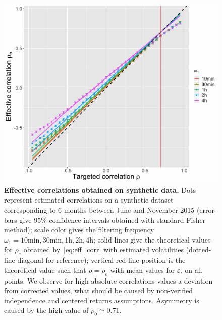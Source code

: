 \documentclass{article}
\begin{document}
\begin{figure}%
\centering
\includegraphics[width=\linewidth]{Fig4.jpg}
\caption{\textbf{Effective correlations obtained on synthetic data.} Dots represent estimated correlations on a synthetic dataset corresponding to 6 months between June and November 2015 (error-bars give 95\% confidence intervals obtained with standard Fisher method); scale color gives the filtering frequency $\omega_1=10\textrm{min},30\textrm{min},1\textrm{h},2\textrm{h},4\textrm{h}$; solid lines give the theoretical values for $\rho_e$ obtained by~\ref{eq:eff_corr} with estimated volatilities (dotted-line diagonal for reference); vertical red line position is the theoretical value such that $\rho = \rho_e$ with mean values for $\varepsilon_i$ on all points. We observe for high absolute correlations values a deviation from corrected values, what should be caused by non-verified independence and centered returns assumptions. Asymmetry is caused by the high value of $\rho_0 \simeq 0.71$.}
\label{fig:effective_corrs}
\end{figure}
\end{document}
